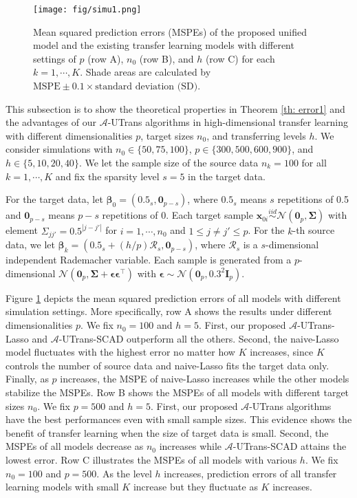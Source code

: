 \documentclass[twoside,12pt]{article}
\newcommand{\mb}[1]{\boldsymbol{\mathbf{#1}}}
\begin{document}
 \begin{figure}[hbt!]
	\centering
	\texttt{[image: fig/simu1.png]}
	\caption{Mean squared prediction errors (MSPEs) of the proposed unified model and the existing transfer learning models with different settings of $p$ (row A), $n_0$ (row B), and $h$ (row C) for each $k=1,\cdots,K$. Shade areas are calculated by $\text{MSPE}\pm 0.1\times \text{standard deviation (SD)}$.}
	\label{fig: simu1}
\end{figure}
	
This subsection is to show the theoretical properties in Theorem \ref{th: error1} and the advantages of our $\mathcal A$-UTrans algorithms in high-dimensional transfer learning with different dimensionalities $p$, target sizes $n_0$, and transferring levels $h$. 
We consider simulations with $n_0\in\{50, 75, 100\}$, $p\in\{300, 500, 600, 900\}$, and $h\in\{5, 10, 20, 40\}$.
We let the sample size of the source data $n_k=100$ for all $k=1,\cdots, K$ and fix the sparsity level $s=5$ in the target data.


For the target data, let $\mb\beta_0=(\mb{0.5}_s, \mb{0}_{p-s})$, where $\mb{0.5}_s$ means $s$ repetitions of 0.5 and $\mb{0}_{p-s}$ means $p-s$ repetitions of 0.
Each target sample $\mb x_{0i}\stackrel{iid}{\sim} \mathcal{N}(\mb 0_p, \mb\Sigma)$ with element $\Sigma_{jj'}=0.5^{|j-j'|}$ for $i=1,\cdots,n_0$ and $1\leq j\neq j'\leq p$.
For the $k$-th source data, we let $\mb\beta_k=(\mb{0.5}_s+(h/p)\mathcal{R}_s, \mb{0}_{p-s})$, where $\mathcal{R}_s$ is a $s$-dimensional independent Rademacher variable.
Each sample is generated from a $p$-dimensional $\mathcal{N}(\mb 0_p, \mb\Sigma+\mb\epsilon\mb\epsilon^\top)$ with $\mb\epsilon\sim \mathcal{N}(\mb 0_p, 0.3^2 \mb I_p)$.


Figure \ref{fig: simu1} depicts the mean squared prediction errors of all models with different simulation settings.
More specifically, row A shows the results under different dimensionalities $p$.
We fix $n_0=100$ and $h=5$.
First, our proposed $\mathcal A$-UTrans-Lasso and $\mathcal A$-UTrans-SCAD outperform all the others.
Second, the naive-Lasso model fluctuates with the highest error no matter how $K$ increases, since $K$ controls the number of source data and naive-Lasso fits the target data only.
Finally, as $p$ increases, the MSPE of  naive-Lasso increases while the other models stabilize the MSPEs.
Row B shows the MSPEs of all models with different target sizes $n_0$.
We fix $p=500$ and $h=5$.
First, our proposed $\mathcal A$-UTrans algorithms have the best performances even with small sample sizes.
This evidence shows the benefit of transfer learning when the size of target data is small.
Second, the MSPEs of all models decrease as $n_0$ increases while $\mathcal A$-UTrans-SCAD attains the lowest error.
Row C illustrates the MSPEs of all models with various $h$.
We fix $n_0=100$ and $p=500$.
As the level $h$ increases, prediction errors of all transfer learning models with small $K$ increase but they fluctuate  as $K$ increases.
\end{document}
